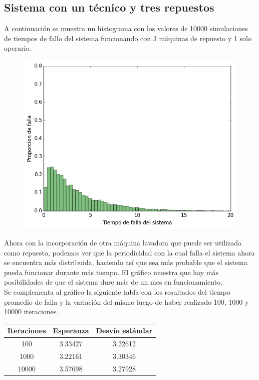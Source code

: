 \documentclass[10pt,a4paper]{article} %
\begin{document}
    \subsection{Sistema con un t\'ecnico y tres repuestos}
    A continuaci\'on se muestra un histograma con los valores de 10000 simulaciones de tiempos de fallo del sistema funcionando con 3 m\'aquinas de repuesto y 1 solo operario.
    \begin {figure}[!htb]
    \centering
    \includegraphics[width=12cm] {img/1op3rep}
    \end {figure}

    Ahora con la incorporaci\'on de otra m\'aquina lavadora que puede ser utilizada como repuesto, podemos ver que la periodicidad con la cual falla el sistema ahora se encuentra m\'as distribuida, haciendo as\'i que sea m\'as probable que el sistema pueda funcionar durante m\'as tiempo. El gr\'afico muestra que hay m\'as posibilidades de que el sistema dure m\'as de un mes en funcionamiento. \\
    Se complementa al gr\'afico la siguiente tabla con los resultados del tiempo promedio de falla y la variaci\'on del mismo luego de haber realizado 100, 1000 y 10000 iteraciones.
    
    \begin{center}
        \begin{tabular}{ c| c| c}
            Iteraciones & Esperanza & Desv\'io est\'andar \\ \hline
            100&    3.33427 & 3.22612  \\ \hline
            1000&   3.22161 & 3.30346  \\ \hline
	        10000&  3.57698 & 3.27928  \\ \hline

        \end{tabular}
    \end{center}
    
\end{document}
